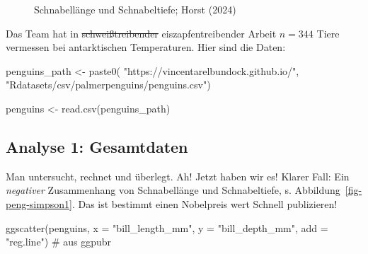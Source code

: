 \documentclass[
  letterpaper,
  twoside,
  open=any]{scrbook}
\newenvironment{Shaded}{\begin{snugshade}}{\end{snugshade}}
\newcommand{\AttributeTok}[1]{\textcolor[rgb]{0.40,0.45,0.13}{#1}}
\newcommand{\CommentTok}[1]{\textcolor[rgb]{0.37,0.37,0.37}{#1}}
\newcommand{\FunctionTok}[1]{\textcolor[rgb]{0.28,0.35,0.67}{#1}}
\newcommand{\NormalTok}[1]{\textcolor[rgb]{0.00,0.23,0.31}{#1}}
\newcommand{\OtherTok}[1]{\textcolor[rgb]{0.00,0.23,0.31}{#1}}
\newcommand{\StringTok}[1]{\textcolor[rgb]{0.13,0.47,0.30}{#1}}
\theoremstyle{definition}
\theoremstyle{definition}
\theoremstyle{definition}
\theoremstyle{remark}
\begin{document}
\begin{figure}


\caption{\label{fig-peng-bill}Schnabellänge und Schnabeltiefe; Horst
(2024)}

\end{figure}%

Das Team hat in \st{schweißtreibender} eiszapfentreibender Arbeit
\(n=344\) Tiere vermessen bei antarktischen Temperaturen. Hier sind die
Daten:

\begin{Shaded}
\begin{Highlighting}[]
\NormalTok{penguins\_path }\OtherTok{\textless{}{-}} \FunctionTok{paste0}\NormalTok{(}
  \StringTok{"https://vincentarelbundock.github.io/"}\NormalTok{,}
  \StringTok{"Rdatasets/csv/palmerpenguins/penguins.csv"}\NormalTok{)}

\NormalTok{penguins }\OtherTok{\textless{}{-}} \FunctionTok{read.csv}\NormalTok{(penguins\_path)}
\end{Highlighting}
\end{Shaded}

\subsection{Analyse 1: Gesamtdaten}\label{analyse-1-gesamtdaten}

Man untersucht, rechnet und überlegt. Ah! Jetzt haben wir es! Klarer
Fall: Ein \emph{negativer} Zusammenhang von Schnabellänge und
Schnabeltiefe, s. Abbildung~\ref{fig-peng-simpson1}. Das ist bestimmt
einen Nobelpreis wert Schnell publizieren!

\begin{Shaded}
\begin{Highlighting}[]
\FunctionTok{ggscatter}\NormalTok{(penguins, }\AttributeTok{x =} \StringTok{"bill\_length\_mm"}\NormalTok{, }\AttributeTok{y =} \StringTok{"bill\_depth\_mm"}\NormalTok{, }
          \AttributeTok{add =} \StringTok{"reg.line"}\NormalTok{)  }\CommentTok{\# aus \textasciigrave{}ggpubr\textasciigrave{}}
\end{Highlighting}
\end{Shaded}
\end{document}
